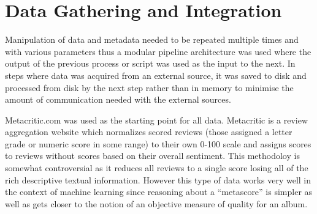 \documentclass{acm_proc_article-sp}
\begin{document}
\section{Data Gathering and Integration}
Manipulation of data and metadata needed to be repeated multiple times
and with various parameters thus a modular pipeline architecture was used where
the output of the previous process or script was used as the input to the 
next. In steps where data was acquired from an external source, it was
saved to disk and processed from disk by the next step rather than in memory
to minimise the amount of communication needed with the external sources.

Metacritic.com was used as the starting point for all data. Metacritic is a
review aggregation website which normalizes scored reviews (those assigned
a letter grade or numeric score in some range) to their own 0-100 scale
and assigns scores to reviews without scores based on their overall sentiment.
This methodoloy is somewhat controversial as it reduces
all reviews to a single score losing all of the rich descriptive textual
information. However this type of data works very well in the context
of machine learning since reasoning about a ``metascore'' is simpler
as well as gets closer to the notion of an objective measure of quality for an album.
\end{document}
